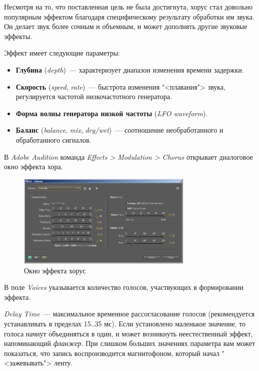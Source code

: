 \documentclass[oneside, final, 14pt]{extreport}
\begin{document}
Несмотря на то, что поставленная цель не была достигнута, хорус стал довольно популярным эффектом благодаря специфическому результату обработки им звука. Он делает звук более сочным и объемным, и может дополнять другие звуковые эффекты.

Эффект имеет следующие параметры:
\begin{itemize}
  \item \textbf{Глубина} (\textit{depth})~--- характеризует диапазон изменения времени задержки.
  \item \textbf{Скорость} (\textit{speed}, \textit{rate})~--- быстрота изменения "<плавания"> звука, регулируется частотой низкочастотного генератора.
  \item \textbf{Форма волны генератора низкой частоты} (\textit{LFO waveform}).
  \item \textbf{Баланс} (\textit{balance}, \textit{mix}, \textit{dry/wet})~--- соотношение необработанного и обработанного сигналов.
\end{itemize}

В \emph{Adobe Audition} команда \textit{Effects > Modulation > Chorus} открывает диалоговое окно эффекта хора.

\begin{figure}[h!]
  \centering
  \includegraphics[width=0.75\textwidth]{pic-auchorus-01}
  \caption{Окно эффекта хорус}
  \label{pic-auchorus-01}
\end{figure}

В поле \textit{Voices} указывается количество голосов, участвующих в формировании эффекта.

\textit{Delay Time}~--- максимальное временное рассогласование голосов (рекомендуется устанавливать в пределах 15..35 мс). Если установлено маленькое значение, то голоса начнут объединяться в один, и может возникнуть неестественный эффект, напоминающий \emph{фланжер}. При слишком больших значениях параметра вам может показаться, что запись воспроизводится магнитофоном, который начал "<зажевывать"> ленту.
\end{document}
